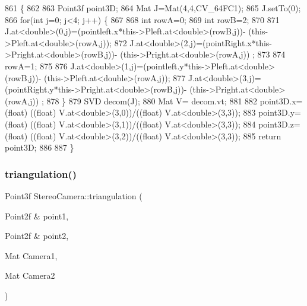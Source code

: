 \begin{DoxyCode}
861                                                                            \{
862 
863     Point3f point3D;
864     Mat J=Mat(4,4,CV\_64FC1);
865     J.setTo(0);
866     \textcolor{keywordflow}{for}(\textcolor{keywordtype}{int} j=0; j<4; j++) \{
867 
868         \textcolor{keywordtype}{int} rowA=0;
869         \textcolor{keywordtype}{int} rowB=2;
870 
871         J.at<\textcolor{keywordtype}{double}>(0,j)=(pointleft.x*this->Pleft.at<\textcolor{keywordtype}{double}>(rowB,j))- (this->Pleft.at<\textcolor{keywordtype}{double}>(rowA,j));
872         J.at<\textcolor{keywordtype}{double}>(2,j)=(pointRight.x*this->Pright.at<\textcolor{keywordtype}{double}>(rowB,j))- (this->Pright.at<\textcolor{keywordtype}{double}>(rowA,j))
      ;
873 
874         rowA=1;
875 
876         J.at<\textcolor{keywordtype}{double}>(1,j)=(pointleft.y*this->Pleft.at<\textcolor{keywordtype}{double}>(rowB,j))- (this->Pleft.at<\textcolor{keywordtype}{double}>(rowA,j));
877         J.at<\textcolor{keywordtype}{double}>(3,j)=(pointRight.y*this->Pright.at<\textcolor{keywordtype}{double}>(rowB,j))- (this->Pright.at<\textcolor{keywordtype}{double}>(rowA,j))
      ;
878     \}
879     SVD decom(J);
880     Mat V= decom.vt;
881 
882     point3D.x=(float) ((\textcolor{keywordtype}{float}) V.at<\textcolor{keywordtype}{double}>(3,0))/((float) V.at<\textcolor{keywordtype}{double}>(3,3));
883     point3D.y=(float) ((\textcolor{keywordtype}{float}) V.at<\textcolor{keywordtype}{double}>(3,1))/((float) V.at<\textcolor{keywordtype}{double}>(3,3));
884     point3D.z=(float) ((\textcolor{keywordtype}{float}) V.at<\textcolor{keywordtype}{double}>(3,2))/((float) V.at<\textcolor{keywordtype}{double}>(3,3));
885     \textcolor{keywordflow}{return} point3D;
886 
887 \}
\end{DoxyCode}
\mbox{\label{classStereoCamera_ab68c8d3bd07f542243d681fbe8c8c6b7}} 
\subsubsection{\texorpdfstring{triangulation()}{triangulation()}\hspace{0.1cm}{\footnotesize\ttfamily [2/2]}}
{\footnotesize\ttfamily Point3f Stereo\+Camera\+::triangulation (\begin{DoxyParamCaption}\item[{Point2f \&}]{point1,  }\item[{Point2f \&}]{point2,  }\item[{Mat}]{Camera1,  }\item[{Mat}]{Camera2 }\end{DoxyParamCaption})}



